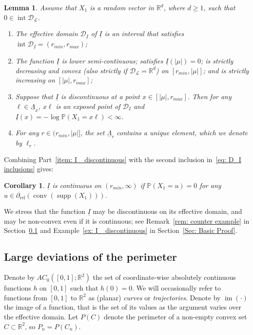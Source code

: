 \documentclass[10pt]{amsart}
\newtheorem{lemm}[theo]{Lemma}\newtheorem{prop}[theo]{Proposition}\newtheorem{coro}[theo]{Corollary}\newtheorem{conj}[theo]{Conjecture}
\theoremstyle{definition}\newtheorem{defi}[theo]{Definition}\newtheorem{rema}[theo]{Remark}\newtheorem{exam}[theo]{Example}\newtheorem{exem}[theo]{Example}\newtheorem{nota}[theo]{Notation}
\DeclareMathOperator{\conv}{conv}
\DeclareMathOperator{\im}{im}
\DeclareMathOperator{\intr}{int}
\DeclareMathOperator{\rel}{rel}
\newcommand{\ubar}[1]{\underline{#1}}
\newcommand{\Rbb}{\mathbb{R}}
\newcommand{\Pbb}{\mathbb{P}}
\newcommand{\Dcl}{\mathcal{D}}
\newcommand{\Lcl}{\mathcal{L}}
\newcommand{\supp}{\mathop{\mathrm{supp}}\nolimits}
\newcommand*{\alphenumi}{\renewcommand*{\theenumi}{\alph{enumi}}}
\begin{document}
\begin{lemm}\label{lem: properties of I_}
Assume that $X_1$ is a random vector in $\Rbb^d$, where $d \ge 1$, such that $0 \in \intr \Dcl_{\Lcl}$.
\begin{enumerate}\alphenumi
\item \label{item: I_ eff domain}
The effective domain $\Dcl_{\ubar{I}}$ of $\ubar I$ is an interval that satisfies $\intr \Dcl_{\ubar{I}} = (r_{min}, r_{max})$;
\item \label{item: I_ unimodal}
The function $\ubar I$ is lower semi-continuous; satisfies $\ubar I (|\mu|)=0$; is strictly decreasing and convex (also strictly if $\Dcl_{\Lcl }=\Rbb^d$) on $[r_{min}, |\mu|]$; and is strictly increasing on $[|\mu|, r_{max}]$;
\item \label{item: I_ discontinuous}
Suppose that $\ubar I$ is discontinuous at a point $x \in [|\mu|, r_{max}]$. Then for any $\ell \in \ubar{\Lambda}_x$, $x \ell$ is an exposed point of $\Dcl_I$ and $\ubar I(x) = -\log \Pbb(X_1 = x \ell)<\infty$.
\item \label{item: one element}
For any $ r \in (r_{min}, |\mu|]$, the set $\ubar{\Lambda}_r$ contains a unique element, which we denote by $\ell_r$.
\end{enumerate}
\end{lemm}

Combining Part~\eqref{item: I_ discontinuous} with the second inclusion in~\eqref{eq: D_I inclusions} gives:
\begin{coro} \label{cor: I_ continuous}
$\ubar I$ is continuous on $(r_{min},\infty)$ if $\Pbb(X_1=u)=0$ for any $u \in \partial_{\rel}(\conv(\supp(X_1)))$.
\end{coro}

We stress that the function $\ubar I$ may be discontinuous on its effective domain, and may be non-convex even if it is continuous; see Remark~\ref{rem: counter example} in Section~\ref{sec: results perimeter} and Example~\ref{ex: I_ discontinuous} in Section~\ref{Sec: Basic Proof}.


\subsection{Large deviations of the perimeter} \label{sec: results perimeter}
Denote by $AC_0([0,1];\Rbb^2)$ the set of coordinate-wise absolutely continuous functions $h$ on $[0,1]$ such that $h(0)=0$. We will occasionally refer to functions from $[0,1]$ to $\Rbb^2$ as (planar) \emph{curves} or \emph{trajectories}. Denote by $\im(\cdot)$ the image of a function, that is the set of its values as the argument varies over the effective domain. Let $P(C)$ denote the perimeter of a non-empty convex set $C \subset \Rbb^2$, so $P_n=P(C_n)$.
\end{document}
